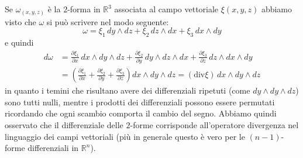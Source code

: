 \documentclass[italian,a4paper]{scrartcl}
\newcommand{\RR}{{\mathbb R}}
\renewcommand{\div}{\mathrm{div}}
\begin{document}
Se $\omega_{(x,y,z)}$ è la $2$-forma in $\RR^3$ associata al campo vettoriale
$\xi(x,y,z)$ abbiamo visto che $\omega$ si può scrivere nel modo seguente:
\[
   \omega = \xi_1\, dy \wedge dz + \xi_2\, dz\wedge dx +
   \xi_3\, dx\wedge dy
\]
e quindi
\begin{align*}
  d \omega &=
  \frac{\partial \xi_1}{\partial x}\, dx\wedge dy\wedge dz +
  \frac{\partial \xi_2}{\partial y}\, dy\wedge dz\wedge dx +
  \frac{\partial \xi_3}{\partial z}\, dz\wedge dx\wedge dy \\
  & =
  \left(\frac{\partial \xi_1}{\partial x} +
  \frac{\partial \xi_2}{\partial y} +
  \frac{\partial \xi_3}{\partial z}\right)
  dx\wedge dy\wedge dz
  = (\div \xi)\, dx\wedge dy\wedge dz
\end{align*}
in quanto i temini che risultano avere dei differenziali ripetuti
(come $dy \wedge dy \wedge dz$) sono tutti nulli, mentre i prodotti
dei differenziali possono essere permutati ricordando che ogni scambio
comporta il cambio del segno. Abbiamo quindi osservato che il
differenziale delle $2$-forme corrisponde all'operatore divergenza nel
linguaggio dei campi vettoriali (più in generale questo è vero per le
$(n-1)$-forme differenziali in $\RR^n$).
\end{document}
